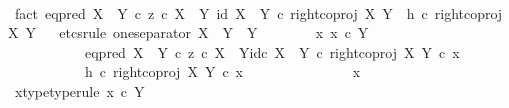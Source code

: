 \begin{isabellebody}
\isanewline
\ \ \ \ \isamarkupfalse%
\isanewline
\ \ \isamarkupfalse%
\isanewline
\isanewline
\ \ \isamarkupfalse%
\ fact{}{\isacharcolon}{\kern0pt}\ {\isachardoublequoteopen}{\isacharparenleft}{\kern0pt}eq{\isacharunderscore}{\kern0pt}pred\ {\isacharparenleft}{\kern0pt}X\ {\isasymCoprod}\ Y{\isacharparenright}{\kern0pt}\ {\isasymcirc}\isactrlsub c\ {\isasymlangle}z\ {\isasymcirc}\isactrlsub c\ {\isasymbeta}\isactrlbsub X\ {\isasymCoprod}\ Y\isactrlesub {\isacharcomma}{\kern0pt}\ id\ {\isacharparenleft}{\kern0pt}X\ {\isasymCoprod}\ Y{\isacharparenright}{\kern0pt}{\isasymrangle}{\isacharparenright}{\kern0pt}\ {\isasymcirc}\isactrlsub c\ right{\isacharunderscore}{\kern0pt}coproj\ X\ Y\ {\isacharequal}{\kern0pt}\ h\ {\isasymcirc}\isactrlsub c\ right{\isacharunderscore}{\kern0pt}coproj\ X\ Y{\isachardoublequoteclose}\isanewline
\ \ \isamarkupfalse%
{\isacharparenleft}{\kern0pt}etcs{\isacharunderscore}{\kern0pt}rule\ one{\isacharunderscore}{\kern0pt}separator{\isacharbrackleft}{\kern0pt}\ X\ {\isacharequal}{\kern0pt}\ Y{\isacharcomma}{\kern0pt}\ \ Y\ {\isacharequal}{\kern0pt}\ {\isasymOmega}{\isacharbrackright}{\kern0pt}{\isacharparenright}{\kern0pt}\isanewline
\ \ \ \ \isamarkupfalse%
\ {\isachardoublequoteopen}{\isasymAnd}x{\isachardot}{\kern0pt}\ x\ {\isasymin}\isactrlsub c\ Y\ {\isasymLongrightarrow}\isanewline
\ \ \ \ \ \ \ \ \ \ \ {\isacharparenleft}{\kern0pt}{\isacharparenleft}{\kern0pt}eq{\isacharunderscore}{\kern0pt}pred\ {\isacharparenleft}{\kern0pt}X\ {\isasymCoprod}\ Y{\isacharparenright}{\kern0pt}\ {\isasymcirc}\isactrlsub c\ {\isasymlangle}z\ {\isasymcirc}\isactrlsub c\ {\isasymbeta}\isactrlbsub X\ {\isasymCoprod}\ Y\isactrlesub {\isacharcomma}{\kern0pt}id\isactrlsub c\ {\isacharparenleft}{\kern0pt}X\ {\isasymCoprod}\ Y{\isacharparenright}{\kern0pt}{\isasymrangle}{\isacharparenright}{\kern0pt}\ {\isasymcirc}\isactrlsub c\ right{\isacharunderscore}{\kern0pt}coproj\ X\ Y{\isacharparenright}{\kern0pt}\ {\isasymcirc}\isactrlsub c\ x\ {\isacharequal}{\kern0pt}\isanewline
\ \ \ \ \ \ \ \ \ \ \ {\isacharparenleft}{\kern0pt}h\ {\isasymcirc}\isactrlsub c\ right{\isacharunderscore}{\kern0pt}coproj\ X\ Y{\isacharparenright}{\kern0pt}\ {\isasymcirc}\isactrlsub c\ x{\isachardoublequoteclose}\isanewline
\ \ \ \ \isamarkupfalse%
\ {\isacharminus}{\kern0pt}\ \isanewline
\ \ \ \ \ \ \isamarkupfalse%
\ x\isanewline
\ \ \ \ \ \ \isamarkupfalse%
\ x{\isacharunderscore}{\kern0pt}type{\isacharbrackleft}{\kern0pt}type{\isacharunderscore}{\kern0pt}rule{\isacharbrackright}{\kern0pt}{\isacharcolon}{\kern0pt}\ {\isachardoublequoteopen}x\ {\isasymin}\isactrlsub c\ Y{\isachardoublequoteclose}\isanewline

\end{isabellebody}
